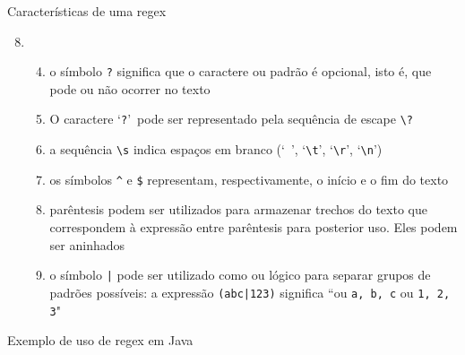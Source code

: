 \begin{frame}[fragile]{Características de uma regex}

    \begin{enumerate}
        \setcounter{enumi}{7}
        \item[] \begin{enumerate}
            \setcounter{enumii}{3}
            \item o símbolo \verb|?| significa que o caractere ou padrão é opcional, isto é, que pode ou não ocorrer no texto
            \item O caractere \lq \verb|?|\rq\ pode ser representado pela sequência de escape 
                \verb|\?|
            \item a sequência \verb|\s| indica espaços em branco (\lq\ \rq, \lq\verb|\t|\rq, 
                \lq\verb|\r|\rq, \lq\verb|\n|\rq)
            \item os símbolos \verb|^| e \verb|$| representam, respectivamente, o início e o fim 
                do texto
            \item parêntesis podem ser utilizados para armazenar trechos do texto que correspondem à expressão entre parêntesis para posterior uso. Eles podem ser aninhados
            \item o símbolo \texttt{|} pode ser utilizado como ou lógico para separar grupos de padrões possíveis: a expressão \texttt{(abc|123)} significa ``ou \texttt{a, b, c} ou \texttt{1, 2, 3}"
        \end{enumerate}
    \end{enumerate}

\end{frame}

\begin{frame}[fragile]{Exemplo de uso de regex em Java}
\end{frame}

